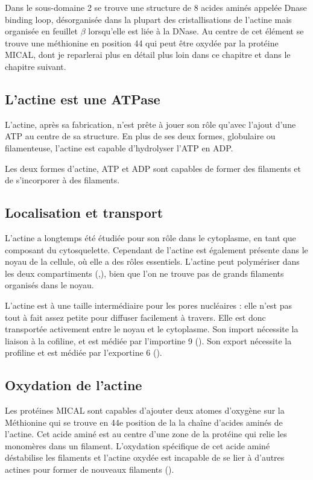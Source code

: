 Dans le sous-domaine 2 se trouve une structure de 8 acides aminés appelée Dnase binding loop, désorganisée dans la plupart des cristallisations de l'actine mais organisée en feuillet $\beta$ lorsqu'elle est liée à la DNase. Au centre de cet élément se trouve une méthionine en position 44 qui peut être oxydée par la protéine MICAL, dont je reparlerai plus en détail plus loin dans ce chapitre et dans le chapitre suivant. 

\subsection{L'actine est une ATPase}

L'actine, après sa fabrication, n'est prête à jouer son rôle qu'avec l'ajout d'une ATP au centre de sa structure.
En plus de ses deux formes, globulaire ou filamenteuse, l'actine est capable d'hydrolyser l'ATP en ADP.

Les deux formes d'actine, ATP et ADP sont capables de former des filaments et de s'incorporer à des filaments. 


\subsection{Localisation et transport}

L'actine a longtemps été étudiée pour son rôle dans le cytoplasme, en tant que composant du cytosquelette. Cependant de l'actine est également présente dans le noyau de la cellule, où elle a des rôles essentiels. 
L'actine peut polymériser dans les deux compartiments (\cite{mcdonald_nucleoplasmic_2006},\cite{baarlink_nuclear_2013}), bien que l'on ne trouve pas de grands filaments organisés dans le noyau. 

L'actine est à une taille intermédiaire pour les pores nucléaires : elle n'est pas tout à fait assez petite pour diffuser facilement à travers. Elle est donc transportée activement entre le noyau et le cytoplasme. 
Son import nécessite la liaison à la cofiline, et est médiée par l'importine 9 (\cite{dopie_active_2012}). Son export nécessite la profiline et est médiée par l'exportine 6 (\cite{dopie_active_2012}).



\subsection{Oxydation de l'actine}

Les protéines MICAL sont capables d'ajouter deux atomes d'oxygène sur la Méthionine qui se trouve en 44e position de la la chaîne d'acides aminés de l'actine. Cet acide aminé est au centre d'une zone de la protéine qui relie les monomères dans un filament. 
L'oxydation spécifique de cet acide aminé déstabilise les filaments et l'actine oxydée est incapable de se lier à d'autres actines pour former de nouveaux filaments (\cite{hung_direct_2011}). 



